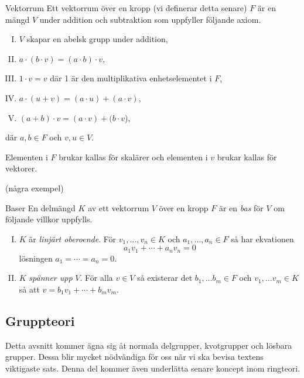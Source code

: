 \documentclass{article}
\theoremstyle{definition}
\begin{document}
\begin{mydef}{Vektorrum}{}
  Ett vektorrum över en kropp (vi definerar detta senare) $F$ är en mängd $V$ under addition och subtraktion som uppfyller följande axiom.
  \begin{enumerate}[I)]
    \item $V$ skapar en abelsk grupp under addition,
    \item $a \cdot (b \cdot v) = (a \cdot b) \cdot v$,
    \item $1 \cdot v = v$ där 1 är den multiplikativa enhetselementet i $F$,
    \item $a \cdot (u + v) = (a \cdot u) + (a \cdot v)$,
    \item $(a + b) \cdot v = (a \cdot v) + (b \cdot v$),
  \end{enumerate}
  där $a, b \in F$ och $v, u \in V$.
\end{mydef}
Elementen i $F$ brukar kallas för skalärer och elementen i $v$ 
brukar kallas för vektorer. 

(några exempel)

\begin{mydef}{Baser}{}
  En delmängd $K$ av ett vektorrum $V$ över en kropp $F$ är en \textit{bas} för $V$ om följande villkor uppfylls.  
  \begin{enumerate}[I)]
    \item $K$ är \textit{linjärt oberoende}. För $v_1, \ldots, v_n \in K$ och $a_1, \ldots, a_n \in F$ så har ekvationen 
    \[a_1v_1 + \cdots + a_n v_n = 0\]
    lösningen $a_1 = \cdots = a_n = 0$.
    \item $K$ \textit{spänner upp} $V$. För alla $v \in V$ så existerar det $b_1, \ldots b_m \in F$ och $v_1, \ldots v_m \in K$ så att 
    $v = b_1 v_1 + \cdots + b_m v_m$.
  \end{enumerate}
\end{mydef}

\subsection{Gruppteori}
Detta avsnitt kommer ägna sig åt normala delgrupper, kvotgrupper och lösbara grupper. 
Dessa blir mycket nödvändiga för oss när vi ska bevisa textens viktigaste sats. 
Denna del kommer även underlätta senare koncept inom ringteori.
\end{document}
